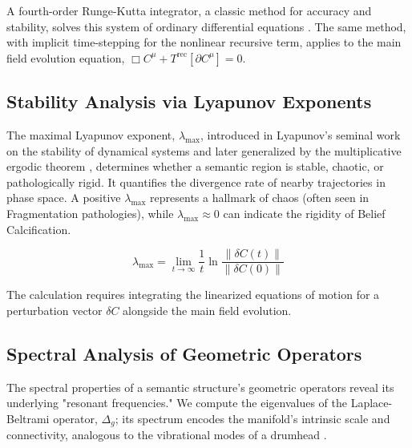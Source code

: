 A fourth-order Runge-Kutta integrator, a classic method for accuracy and stability, solves this system of ordinary differential equations \autocite{Runge1895, Kutta1901}. The same method, with implicit time-stepping for the nonlinear recursive term, applies to the main field evolution equation, \(\Box C^\mu + T^{\text{rec}}[\partial C^\mu] = 0\).


\subsection{Stability Analysis via Lyapunov Exponents}
\label{17.3.2:stability_analysis_via_lyapunov_exponents}

The maximal Lyapunov exponent, \(\lambda_{\max}\), introduced in Lyapunov's seminal work on the stability of dynamical systems and later generalized by the multiplicative ergodic theorem \autocite{Lyapunov1907, Oseledets1968}, determines whether a semantic region is stable, chaotic, or pathologically rigid. It quantifies the divergence rate of nearby trajectories in phase space. A positive \(\lambda_{\max}\) represents a hallmark of chaos (often seen in Fragmentation pathologies), while \(\lambda_{\max} \approx 0\) can indicate the rigidity of Belief Calcification.

\begin{equation}
\lambda_{\max} = \lim_{t \to \infty} \frac{1}{t} \ln \frac{\|\delta C(t)\|}{\|\delta C(0)\|}
\end{equation}

The calculation requires integrating the linearized equations of motion for a perturbation vector \(\delta C\) alongside the main field evolution.


\subsection{Spectral Analysis of Geometric Operators}
\label{17.3.3:spectral_analysis_of_geometric_operators}

The spectral properties of a semantic structure's geometric operators reveal its underlying "resonant frequencies." We compute the eigenvalues of the Laplace-Beltrami operator, \(\Delta_g\); its spectrum encodes the manifold's intrinsic scale and connectivity, analogous to the vibrational modes of a drumhead \autocite{Chung1997}.

